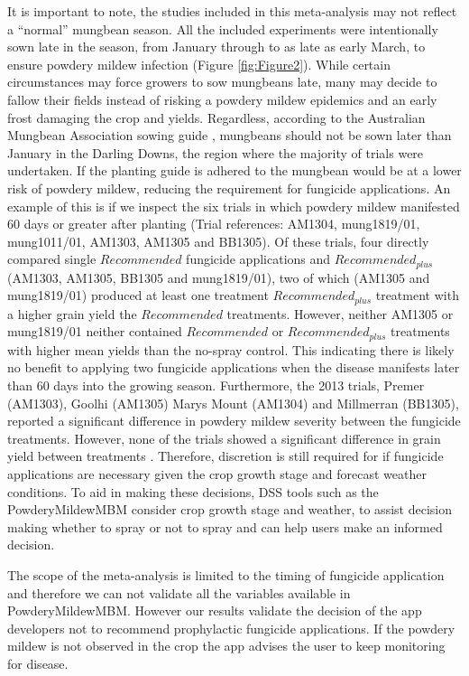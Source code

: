 \documentclass[agronomy,article,submit,moreauthors,pdftex]{mdpi}
\begin{document}
It is important to note, the studies included in this meta-analysis may not reflect a ``normal'' mungbean season.
All the included experiments were intentionally sown late in the season, from January through to as late as early March, to ensure powdery mildew infection (Figure \ref{fig:Figure2}).
While certain circumstances may force growers to sow mungbeans late, many may decide to fallow their fields instead of risking a powdery mildew epidemics and an early frost damaging the crop and yields.
Regardless, according to the Australian Mungbean Association sowing guide \citep{AMAplanting}, mungbeans should not be sown later than January in the Darling Downs, the region where the majority of trials were undertaken.
If the planting guide is adhered to the mungbean would be at a lower risk of powdery mildew, reducing the requirement for fungicide applications.
An example of this is if we inspect the six trials in which powdery mildew manifested 60 days or greater after planting (Trial references: AM1304, mung1819/01, mung1011/01, AM1303, AM1305 and BB1305).
Of these trials, four directly compared single \(Recommended\) fungicide applications and \(Recommended_{plus}\) (AM1303, AM1305, BB1305 and mung1819/01), two of which (AM1305 and mung1819/01) produced at least one treatment \(Recommended_{plus}\) treatment with a higher grain yield the \(Recommended\) treatments.
However, neither AM1305 or mung1819/01 neither contained \(Recommended\) or \(Recommended_{plus}\) treatments with higher mean yields than the no-spray control.
This indicating there is likely no benefit to applying two fungicide applications when the disease manifests later than 60 days into the growing season.
Furthermore, the 2013 trials, Premer (AM1303), Goolhi (AM1305) Marys Mount (AM1304) and Millmerran (BB1305), reported a significant difference in powdery mildew severity between the fungicide treatments.
However, none of the trials showed a significant difference in grain yield between treatments \citep[\citet{premer2013}, \citet{Marysmount2013}, \citet{goolhi2013}]{Millmerran2013}.
Therefore, discretion is still required for if fungicide applications are necessary given the crop growth stage and forecast weather conditions.
To aid in making these decisions, DSS tools such as the PowderyMildewMBM consider crop growth stage and weather, to assist decision making whether to spray or not to spray \citep{Diggle} and can help users make an informed decision.

The scope of the meta-analysis is limited to the timing of fungicide application and therefore we can not validate all the variables available in PowderyMildewMBM.
However our results validate the decision of the app developers not to recommend prophylactic fungicide applications.
If the powdery mildew is not observed in the crop the app advises the user to keep monitoring for disease.
\end{document}

